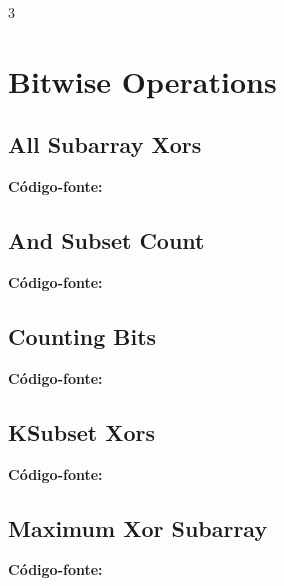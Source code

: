 \documentclass[8pt]{extarticle}
\begin{document}
\pagebreak
\begin{multicols*}{3}

\section{Bitwise Operations}

\subsection{All Subarray Xors}
\begin{caixaenunciado}

\end{caixaenunciado}
\vspace{0.3cm}
\noindent\textbf{Código-fonte:}


\subsection{And Subset Count}
\begin{caixaenunciado}

\end{caixaenunciado}
\vspace{0.3cm}
\noindent\textbf{Código-fonte:}


\subsection{Counting Bits}
\begin{caixaenunciado}

\end{caixaenunciado}
\vspace{0.3cm}
\noindent\textbf{Código-fonte:}


\subsection{KSubset Xors}
\begin{caixaenunciado}

\end{caixaenunciado}
\vspace{0.3cm}
\noindent\textbf{Código-fonte:}


\subsection{Maximum Xor Subarray}
\begin{caixaenunciado}

\end{caixaenunciado}
\vspace{0.3cm}
\noindent\textbf{Código-fonte:}



\end{multicols*}
\end{document}
